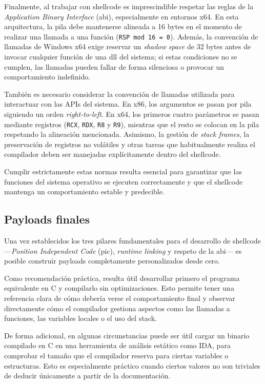 Finalmente, al trabajar con shellcode es imprescindible respetar las reglas de la \textit{Application Binary Interface} (\acrshort{abi}), especialmente en entornos x64. En esta arquitectura, la pila debe mantenerse alineada a 16 bytes en el momento de realizar una llamada a una función (\texttt{RSP mod 16 = 0}). Además, la convención de llamadas de Windows x64 exige reservar un \textit{shadow space} de 32 bytes antes de invocar cualquier función de una \acrshort{dll} del sistema; si estas condiciones no se cumplen, las llamadas pueden fallar de forma silenciosa o provocar un comportamiento indefinido.

También es necesario considerar la convención de llamadas utilizada para interactuar con las APIs del sistema. En x86, los argumentos se pasan por pila siguiendo un orden \textit{right-to-left}. En x64, los primeros cuatro parámetros se pasan mediante registros (\texttt{RCX}, \texttt{RDX}, \texttt{R8} y \texttt{R9}), mientras que el resto se colocan en la pila respetando la alineación mencionada. Asimismo, la gestión de \textit{stack frames}, la preservación de registros no volátiles y otras tareas que habitualmente realiza el compilador deben ser manejadas explícitamente dentro del shellcode.

Cumplir estrictamente estas normas resulta esencial para garantizar que las funciones del sistema operativo se ejecuten correctamente y que el shellcode mantenga un comportamiento estable y predecible.

\subsection{Payloads finales}

Una vez establecidos los tres pilares fundamentales para el desarrollo de shellcode —\textit{Position Independent Code} (\acrshort{pic}), \textit{runtime linking} y respeto de la \acrshort{abi}— es posible construir payloads completamente personalizados desde cero.

Como recomendación práctica, resulta útil desarrollar primero el programa equivalente en C y compilarlo sin optimizaciones. Esto permite tener una referencia clara de cómo debería verse el comportamiento final y observar directamente cómo el compilador gestiona aspectos como las llamadas a funciones, las variables locales o el uso del stack.

De forma adicional, en algunas circunstancias puede ser útil cargar un binario compilado en C en una herramienta de análisis estático como IDA, para comprobar el tamaño que el compilador reserva para ciertas variables o estructuras. Esto es especialmente práctico cuando ciertos valores no son triviales de deducir únicamente a partir de la documentación.

